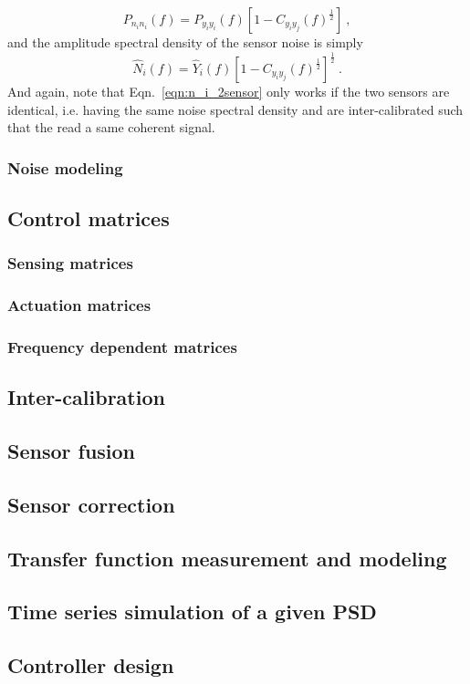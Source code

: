 \begin{equation}
	P_{n_i n_i}(f) = P_{y_iy_i}(f)\left[1-C_{y_iy_j}(f)^\frac{1}{2}\right]\ ,
\end{equation}
and
the amplitude spectral density of the sensor noise is simply
\begin{equation}
	\hat{N}_i(f) = \hat{Y}_i(f)\left[1-C_{y_iy_j}(f)^\frac{1}{2}\right]^\frac{1}{2}\ .
	\label{eqn:n_i_2sensor}
\end{equation}
And again, note that Eqn.~\eqref{eqn:n_i_2sensor} only works if the two sensors are identical, i.e. having the same noise spectral density and are inter-calibrated such that the read a same coherent signal.



\subsubsection{Noise modeling \label{sec:noise_modeling_baseline}}
\subsection{Control matrices}
\subsubsection{Sensing matrices}
\subsubsection{Actuation matrices}
\subsubsection{Frequency dependent matrices}
\subsection{Inter-calibration}
\subsection{Sensor fusion}
\subsection{Sensor correction}
\subsection{Transfer function measurement and modeling}
\subsection{Time series simulation of a given PSD}
\subsection{Controller design}

